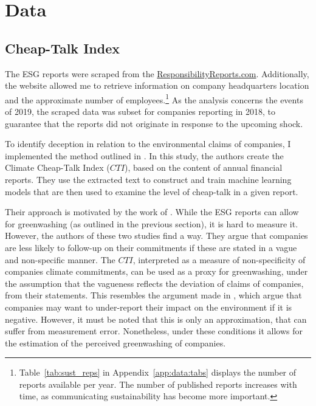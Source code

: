\documentclass[12pt]{article}
\begin{document}
\section{Data}\label{sect:data}

\subsection{Cheap-Talk Index}

The ESG reports were scraped from the \href{https://responsibilityreports.com}{ResponsibilityReports.com}. Additionally, the website allowed me to retrieve information on company headquarters location and the approximate number of employees.\footnote{Table~\ref{tab:sust_reps} in Appendix~\ref{app:data:tabs} displays the number of reports available per year. The number of published reports increases with time, as communicating sustainability has become more important.} As the analysis concerns the events of 2019, the scraped data was subset for companies reporting in 2018, to guarantee that the reports did not originate in response to the upcoming shock. 

To identify deception in relation to the environmental claims of companies, I implemented the method outlined in \textcite{binglerHowCheapTalk2024}. In this study, the authors create the Climate Cheap-Talk Index ($CTI$), based on the content of annual financial reports. They use the extracted text to construct and train machine learning models that are then used to examine the level of cheap-talk in a given report. 

Their approach is motivated by the work of \textcite{coenAreCorporateClimate2022, ramusWhenAreCorporate2005}. While the ESG reports can allow for greenwashing (as outlined in the previous section), it is hard to measure it. However, the authors of these two studies find a way. They argue that companies are less likely to follow-up on their commitments if these are stated in a vague and non-specific manner. The $CTI$, interpreted as a measure of non-specificity of companies climate commitments, can be used as a proxy for greenwashing, under the assumption that the vagueness reflects the deviation of claims of companies, from their statements. This resembles the argument made in \textcite{binglerCheapTalkCherrypicking2022,marquisScrutinyNormsSelective2016}, which argue that companies may want to under-report their impact on the environment if it is negative. However, it must be noted that this is only an approximation, that can suffer from measurement error. Nonetheless, under these conditions it allows for the estimation of the perceived greenwashing of companies. 
\end{document}
